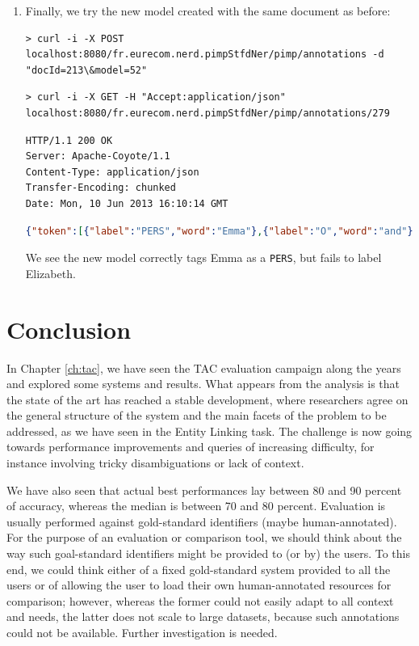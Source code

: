 \documentclass[a4paper,11pt]{report}
\begin{document}
\begin{enumerate}
\item Finally, we try the new model created with the same document as before:

\begin{lstlisting}
> curl -i -X POST localhost:8080/fr.eurecom.nerd.pimpStfdNer/pimp/annotations -d "docId=213\&model=52"
\end{lstlisting}

\begin{lstlisting}
> curl -i -X GET -H "Accept:application/json" localhost:8080/fr.eurecom.nerd.pimpStfdNer/pimp/annotations/279
\end{lstlisting}

\begin{lstlisting}
HTTP/1.1 200 OK
Server: Apache-Coyote/1.1
Content-Type: application/json
Transfer-Encoding: chunked
Date: Mon, 10 Jun 2013 16:10:14 GMT
\end{lstlisting}
\begin{lstlisting}[language=json]
{"token":[{"label":"PERS","word":"Emma"},{"label":"O","word":"and"},{"label":"O","word":"Elizabeth"},{"label":"O","word":"shared"},{"label":"O","word":"a"},{"label":"O","word":"dream"},{"label":"O","word":"."}]}
\end{lstlisting}

We see the new model correctly tags Emma as a \texttt{PERS}, but fails to label Elizabeth.






\end{enumerate}

\chapter{Conclusion}
In Chapter \ref{ch:tac}, we have seen the TAC evaluation campaign along the years and explored some systems and results. What appears from the analysis is that the state of the art has reached a stable development, where researchers agree on the general structure of the system and the main facets of the problem to be addressed, as we have seen in the Entity Linking task. The challenge is now going towards performance improvements and queries of increasing difficulty, for instance involving tricky disambiguations or lack of context.

We have also seen that actual best performances lay between 80 and 90 percent of accuracy, whereas the median is between 70 and 80 percent. %
Evaluation is usually performed against gold-standard identifiers (maybe human-annotated).  For the purpose of an evaluation or comparison tool, we should think about the way such goal-standard identifiers might be provided to (or by) the users. To this end, we could think either of a fixed gold-standard system provided to all the users or of allowing the user to load their own human-annotated resources for comparison; however, whereas the former could not easily adapt to all context and needs, the latter does not scale to large datasets, because such annotations could not be available. Further investigation is needed.
\end{document}
